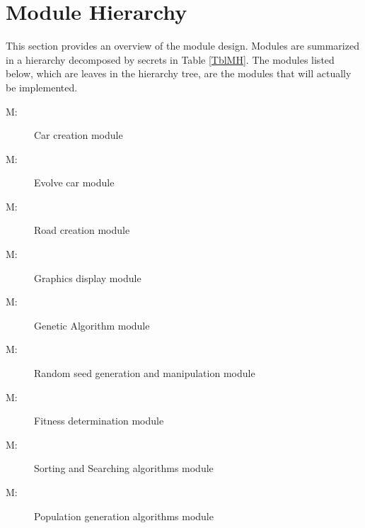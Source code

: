 \documentclass[12pt, titlepage]{article}
\newcounter{mnum}
\newcommand{\mthemnum}{M\themnum}
\begin{document}
\section{Module Hierarchy} \label{SecMH}

This section provides an overview of the module design. Modules are summarized
in a hierarchy decomposed by secrets in Table \ref{TblMH}. The modules listed
below, which are leaves in the hierarchy tree, are the modules that will
actually be implemented.

\begin{description}
\item [ \mthemnum \label{mCreateCar}:]  Car creation module
\item [ \mthemnum \label{mEvolveCar}:] Evolve car module
\item [ \mthemnum \label{mCreateRoad}:] Road creation module
\item [ \mthemnum \label{mGraphicsDisplay}:] Graphics display module
\item [ \mthemnum \label{mGeneticAlgorithm}:] Genetic Algorithm module
\item [ \mthemnum \label{mRandomSeed}:] Random seed generation and manipulation module
\item [ \mthemnum \label{mFitness}:] Fitness determination module
\item [ \mthemnum \label{mSortingAndSearching}:] Sorting and Searching algorithms module
\item [ \mthemnum \label{mPopulationGeneration}:] Population generation algorithms module
\end{description}
\end{document}
